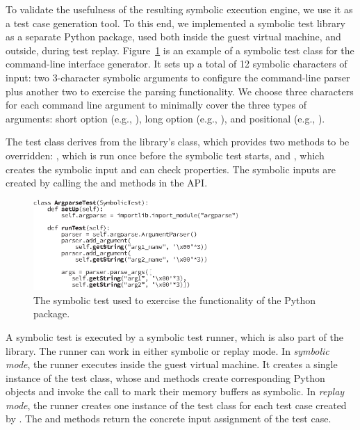 To validate the usefulness of the resulting symbolic execution engine, we use it as a test case generation tool.  To this end, we implemented a symbolic test library as a separate Python package, used both inside the guest virtual machine, and outside, during test replay.
%
Figure~\ref{fig:sample-test} is an example of a symbolic test class for the  command-line interface generator. It sets up a total of 12 symbolic characters of input: two 3-character symbolic arguments to configure the command-line parser plus another two to exercise the parsing functionality.
%
We choose three characters for each command line argument to minimally cover the three types of arguments: short option (e.g., ), long option (e.g., ), and positional (e.g., ).

The test class derives from the library's  class, which provides two methods to be overridden: , which is run once before the symbolic test starts, and , which creates the symbolic input and can check properties.  The symbolic inputs are created by calling the  and  methods in the  API.

\begin{figure}
  \centering
  \includegraphics[width=0.7\textwidth]{evaluation/figures/symtest}
  \caption{The symbolic test used to exercise the functionality of the Python  package.}
  \label{fig:sample-test}
\end{figure}

A symbolic test is executed by a symbolic test runner, which is also part of the library.  The runner can work in either symbolic or replay mode. 
%
In \emph{symbolic mode}, the runner executes inside the guest virtual machine.  It creates a single instance of the test class, whose  and  methods create corresponding Python objects and invoke the  call to mark their memory buffers as symbolic.
%
In \emph{replay mode}, the runner creates one instance of the test class for each test case created by \chef. The  and  methods return the concrete input assignment of the test case.


